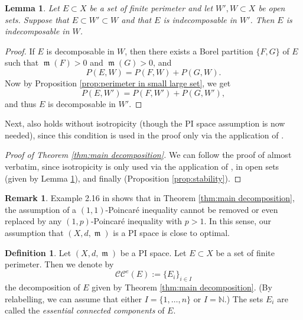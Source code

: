 \documentclass[11pt]{article}
\numberwithin{equation}{section}
\theoremstyle{plain}
\newtheorem{lemma}[equation]{Lemma}
\theoremstyle{definition}
\newtheorem{definition}[equation]{Definition}
\newtheorem{remark}[equation]{Remark}
\numberwithin{equation}{section}
\newcommand{\N}{{\mathbb N}}
\newcommand{\CC}{\mathcal{C}\mathcal{C}}
\DeclareMathOperator{\frm}{\mathfrak{m}}
\begin{document}
\begin{lemma}\label{lem:second lemma}
	Let $E\subset X$
	be a set of finite perimeter and let $W',W\subset X$ be open sets. Suppose that $E\subset W'\subset W$
	and that $E$ is indecomposable in $W'$. Then $E$ is indecomposable in $W$.
\end{lemma}
\begin{proof}
If $E$ is decomposable in $W$, then there exists a Borel partition
$\{F,G\}$ of $E$ such that $\frm(F)>0$ and $\frm(G)>0$, and
\[
P(E,W)=P(F,W)+P(G,W).
\]
Now by Proposition \ref{prop:perimeter in small large set}, we get
\[
P(E,W')=P(F,W')+P(G,W'),
\]
and thus $E$ is decomposable in $W'$.
\end{proof}

Next, \cite[Proposition 2.13]{BPR} also holds without isotropicity
(though the PI space assumption is now needed),
since this condition is used in the proof only via the application of \cite[Corollary 2.9]{BPR}. 

\begin{proof}[Proof of Theorem \ref{thm:main decomposition}]
We can follow the proof of \cite[Theorem 2.14]{BPR} almost verbatim,
since isotropicity is only used via the
application of \cite[Proposition 2.13]{BPR},
\cite[Lemma 2.11]{BPR} in open sets (given by Lemma \ref{lem:second lemma}),
and finally \cite[Proposition 2.10]{BPR} (Proposition \ref{prop:stability}).
\end{proof}

\begin{remark}
Example 2.16 in \cite{BPR} shows that in Theorem \ref{thm:main decomposition}, the assumption of a $(1,1)$-Poincar\'e inequality cannot be removed or even
replaced by any $(1,p)$-Poincar\'e inequality with $p>1$.
In this sense, our assumption that $(X,d,\frm)$ is a PI space is close to optimal.
\end{remark}

\begin{definition}
Let $(X,d,\frm)$ be a PI space. Let $E\subset X$ be a set of finite perimeter.
Then we denote by
\[
\CC^e(E):=\{E_i\}_{i\in I}
\]
the decomposition of $E$ given by Theorem \ref{thm:main decomposition}.
(By relabelling, we can assume that either
$I=\{1,\ldots,n\}$ or $I=\N$.)
The sets $E_i$ are called the \emph{essential connected components} of $E$.
\end{definition}
\end{document}
